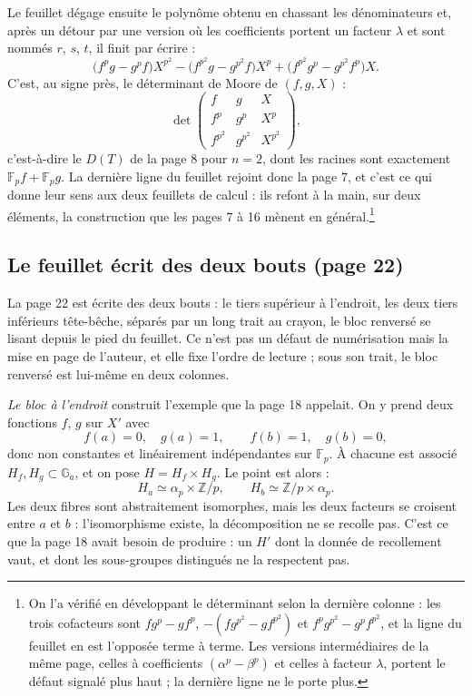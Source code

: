 \documentclass[11pt,a4paper]{article}
\begin{document}
Le feuillet dégage ensuite le polynôme obtenu en chassant les dénominateurs
et, après un détour par une version où les coefficients portent un facteur
$\lambda$ et sont nommés $r$, $s$, $t$, il finit par écrire :
\[
  \bigl(f^p g - g^p f\bigr) X^{p^2}
  - \bigl(f^{p^2} g - g^{p^2} f\bigr) X^{p}
  + \bigl(f^{p^2} g^{p} - g^{p^2} f^{p}\bigr) X .
\]
C'est, au signe près, le déterminant de Moore de $(f, g, X)$ :
\[
  \det\begin{pmatrix} f & g & X \\ f^p & g^p & X^p \\
  f^{p^2} & g^{p^2} & X^{p^2}\end{pmatrix} ,
\]
c'est-à-dire le $D(T)$ de la page 8 pour $n = 2$, dont les racines sont
exactement $\mathbb{F}_p f + \mathbb{F}_p g$. La dernière ligne du feuillet
rejoint donc la page 7, et c'est ce qui donne leur sens aux deux feuillets de
calcul : ils refont à la main, sur deux éléments, la construction que les
pages 7 à 16 mènent en général.\footnote{On l'a vérifié en développant le
déterminant selon la dernière colonne : les trois cofacteurs sont
$fg^p - gf^p$, $-(fg^{p^2} - gf^{p^2})$ et $f^pg^{p^2} - g^pf^{p^2}$, et la
ligne du feuillet en est l'opposée terme à terme. Les versions
intermédiaires de la même page, celles à coefficients $(\alpha^p - \beta^p)$
et celles à facteur $\lambda$, portent le défaut signalé plus haut ; la
dernière ligne ne le porte plus.}

\subsection*{Le feuillet écrit des deux bouts (page 22)}

La page 22 est écrite des deux bouts : le tiers supérieur à l'endroit, les
deux tiers inférieurs tête-bêche, séparés par un long trait au crayon, le
bloc renversé se lisant depuis le pied du feuillet. Ce n'est pas un défaut de
numérisation mais la mise en page de l'auteur, et elle fixe l'ordre de
lecture ; sous son trait, le bloc renversé est lui-même en deux colonnes.

\emph{Le bloc à l'endroit} construit l'exemple que la page 18 appelait. On y
prend deux fonctions $f$, $g$ sur $X'$ avec
\[
  f(a) = 0, \quad g(a) = 1, \qquad f(b) = 1, \quad g(b) = 0 ,
\]
donc non constantes et linéairement indépendantes sur $\mathbb{F}_p$. À
chacune est associé $H_f, H_g \subset \mathbb{G}_a$, et on pose $H = H_f
\times H_g$. Le point est alors :
\[
  H_a \simeq \alpha_p \times \mathbb{Z}/p , \qquad
  H_b \simeq \mathbb{Z}/p \times \alpha_p .
\]
Les deux fibres sont abstraitement isomorphes, mais les deux facteurs se
croisent entre $a$ et $b$ : l'isomorphisme existe, la décomposition ne se
recolle pas. C'est ce que la page 18 avait besoin de produire : un
$H'$ dont la donnée de recollement vaut, et dont les sous-groupes distingués
ne la respectent pas.
\end{document}

